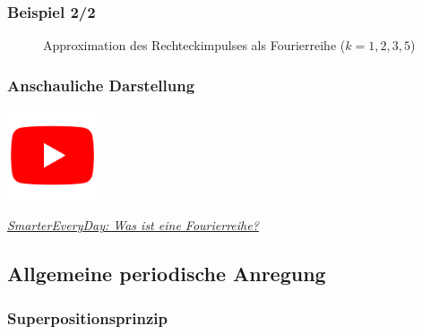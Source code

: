 \documentclass[hyperref={pdfpagemode=FullScreen, colorlinks=false}]{beamer}
\begin{document}
\begin{frame}
\frametitle{Beispiel 2/2}
\begin{figure}

\caption{Approximation des Rechteckimpulses als Fourierreihe ($k=1,2,3,5$)}
\end{figure}
\end{frame}


\begin{frame}
\frametitle{Anschauliche Darstellung}
\vfill
\begin{center}
\includegraphics[width=0.2\textwidth]{fig_img/youtube.png}  

\href{https://www.youtube.com/watch?v=ds0cmAV-Yek}{\textsl{SmarterEveryDay: Was ist eine Fourierreihe?}}
\end{center}  
\vfill
\end{frame}


\subsection{Allgemeine periodische Anregung}

\begin{frame}
\frametitle{Superpositionsprinzip}
\begin{center}

\end{center}
\end{frame}
\end{document}
